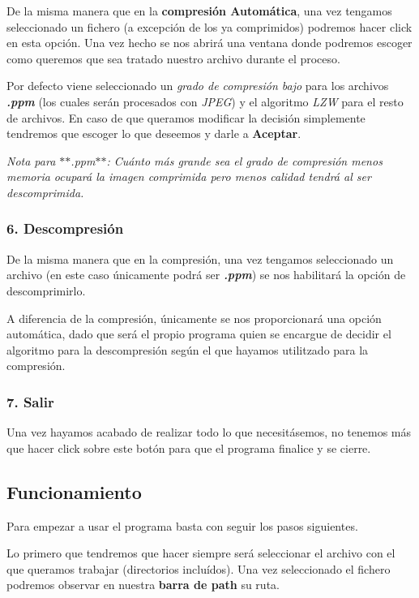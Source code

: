 De la misma manera que en la {\bfseries compresión Automática}, una vez tengamos seleccionado un fichero (a excepción de los ya comprimidos) podremos hacer click en esta opción. Una vez hecho se nos abrirá una ventana donde podremos escoger como queremos que sea tratado nuestro archivo durante el proceso.



Por defecto viene seleccionado un {\itshape grado de compresión bajo} para los archivos {\itshape {\bfseries .ppm}} (los cuales serán procesados con {\itshape J\+P\+EG}) y el algoritmo {\itshape L\+ZW} para el resto de archivos. En caso de que queramos modificar la decisión simplemente tendremos que escoger lo que deseemos y darle a {\bfseries Aceptar}.

{\itshape Nota para $\ast$$\ast$.ppm$\ast$$\ast$\+: Cuánto más grande sea el grado de compresión menos memoria ocupará la imagen comprimida pero menos calidad tendrá al ser descomprimida.}

\subsubsection*{6. Descompresión}

De la misma manera que en la compresión, una vez tengamos seleccionado un archivo (en este caso únicamente podrá ser {\itshape {\bfseries .ppm}}) se nos habilitará la opción de descomprimirlo.

A diferencia de la compresión, únicamente se nos proporcionará una opción automática, dado que será el propio programa quien se encargue de decidir el algoritmo para la descompresión según el que hayamos utilitzado para la compresión.

\subsubsection*{7. Salir}

Una vez hayamos acabado de realizar todo lo que necesitásemos, no tenemos más que hacer click sobre este botón para que el programa finalice y se cierre.

 

\subsection*{Funcionamiento}

Para empezar a usar el programa basta con seguir los pasos siguientes.

Lo primero que tendremos que hacer siempre será seleccionar el archivo con el que queramos trabajar (directorios incluídos). Una vez seleccionado el fichero podremos observar en nuestra {\bfseries barra de path} su ruta.

